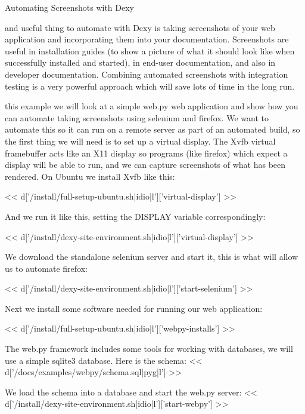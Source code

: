 \documentclass[custom, plainsections]{sciposter}
\begin{document}
\begin{multicols*}{2}
\small

\large
Automating Screenshots with Dexy
\small

\label{sec:automating-screenshots}

\vspace{5pt}

 and useful thing to automate with Dexy is taking screenshots of your web application and incorporating them into your documentation. Screenshots are useful in installation guides (to show a picture of what it should look like when successfully installed and started), in end-user documentation, and also in developer documentation. Combining automated screenshots with integration testing is a very powerful approach which will save lots of time in the long run.

 this example we will look at a simple web.py web application and show how you can automate taking screenshots using selenium and firefox. We want to automate this so it can run on a remote server as part of an automated build, so the first thing we will need is to set up a virtual display. The Xvfb virtual framebuffer acts like an X11 display so programs (like firefox) which expect a display will be able to run, and we can capture screenshots of what has been rendered. On Ubuntu we install Xvfb like this:

<< d['/install/full-setup-ubuntu.sh|idio|l']['virtual-display'] >>

And we run it like this, setting the DISPLAY variable correspondingly:

<< d['/install/dexy-site-environment.sh|idio|l']['virtual-display'] >>

We download the standalone selenium server and start it, this is what will allow us to automate firefox:

<< d['/install/dexy-site-environment.sh|idio|l']['start-selenium'] >>

Next we install some software needed for running our web application:

<< d['/install/full-setup-ubuntu.sh|idio|l']['webpy-installs'] >>

The web.py framework includes some tools for working with databases, we will use a simple sqlite3 database. Here is the schema:
<< d['/docs/examples/webpy/schema.sql|pyg|l'] >>

We load the schema into a database and start the web.py server:
<< d['/install/dexy-site-environment.sh|idio|l']['start-webpy'] >>


\end{multicols*}
\end{document}
